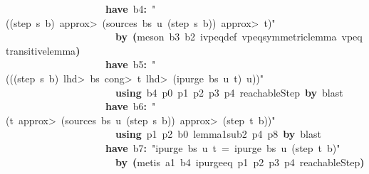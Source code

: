 \documentclass{article}
\newcommand{\syntaxKEYWORDA}[1]{\textcolor[rgb]{0.0,0.4,0.6}{\textbf{#1}}}
\newcommand{\syntaxLITERALA}[1]{\textcolor[rgb]{1.0,0.0,0.8}{#1}}
\newcommand{\syntaxOPERATOR}[1]{\textcolor[rgb]{0.0,0.0,0.0}{\textbf{#1}}}
\newcommand{\syntaxKEYWORDA}[1]{\textcolor[rgb]{0.0,0.4,0.6}{\textbf{#1}}}
\newcommand{\syntaxLITERALA}[1]{\textcolor[rgb]{1.0,0.0,0.8}{#1}}
\newcommand{\syntaxOPERATOR}[1]{\textcolor[rgb]{0.0,0.0,0.0}{\textbf{#1}}}
\newcommand{\syntaxKEYWORDA}[1]{\textcolor[rgb]{0.0,0.4,0.6}{\textbf{#1}}}
\newcommand{\syntaxLITERALA}[1]{\textcolor[rgb]{1.0,0.0,0.8}{#1}}
\newcommand{\syntaxOPERATOR}[1]{\textcolor[rgb]{0.0,0.0,0.0}{\textbf{#1}}}
\newcommand{\syntaxKEYWORDA}[1]{\textcolor[rgb]{0.0,0.4,0.6}{#1}}
\newcommand{\syntaxLITERALA}[1]{\textcolor[rgb]{1.0,0.0,0.8}{\textbf{#1}}}
\newcommand{\syntaxOPERATOR}[1]{\textcolor[rgb]{0.0,0.0,0.0}{#1}}
\newcommand{\syntaxKEYWORDA}[1]{\textcolor[rgb]{0.0,0.4,0.6}{\textbf{#1}}}
\newcommand{\syntaxLITERALA}[1]{\textcolor[rgb]{1.0,0.0,0.8}{#1}}
\newcommand{\syntaxOPERATOR}[1]{\textcolor[rgb]{0.0,0.0,0.0}{\textbf{#1}}}
\newcommand{\syntaxKEYWORDA}[1]{\textcolor[rgb]{0.0,0.4,0.6}{\textbf{#1}}}
\newcommand{\syntaxLITERALA}[1]{\textcolor[rgb]{1.0,0.0,0.8}{#1}}
\newcommand{\syntaxOPERATOR}[1]{\textcolor[rgb]{0.0,0.0,0.0}{\textbf{#1}}}
\begin{document}
{\ }{\ }{\ }{\ }{\ }{\ }{\ }{\ }{\ }{\ }{\ }{\ }{\ }{\ }{\ }{\ }{\ }{\ }{\ }{\ }\syntaxKEYWORDA{have}{\ }b4\syntaxOPERATOR{:}{\ }\syntaxLITERALA{"((step{\ }s{\ }b){\ }\<approx>{\ }(sources{\ }bs{\ }u{\ }(step{\ }s{\ }b)){\ }\<approx>{\ }t)"}\hspace*{\fill}\\
{\ }{\ }{\ }{\ }{\ }{\ }{\ }{\ }{\ }{\ }{\ }{\ }{\ }{\ }{\ }{\ }{\ }{\ }{\ }{\ }{\ }{\ }\syntaxKEYWORDA{by}{\ }\syntaxOPERATOR{(}meson{\ }b3{\ }b2{\ }ivpeq\usebox{\underscorebox}def{\ }vpeq\usebox{\underscorebox}symmetric\usebox{\underscorebox}lemma{\ }vpeq\usebox{\underscorebox}transitive\usebox{\underscorebox}lemma\syntaxOPERATOR{)}\hspace*{\fill}\\
{\ }{\ }{\ }{\ }{\ }{\ }{\ }{\ }{\ }{\ }{\ }{\ }{\ }{\ }{\ }{\ }{\ }{\ }{\ }{\ }\syntaxKEYWORDA{have}{\ }b5\syntaxOPERATOR{:}{\ }\syntaxLITERALA{"(((step{\ }s{\ }b){\ }\<lhd>{\ }bs{\ }\<cong>{\ }t{\ }\<lhd>{\ }(ipurge{\ }bs{\ }u{\ }t){\ }\usebox{\atbox}{\ }u))"}\hspace*{\fill}\\
{\ }{\ }{\ }{\ }{\ }{\ }{\ }{\ }{\ }{\ }{\ }{\ }{\ }{\ }{\ }{\ }{\ }{\ }{\ }{\ }{\ }{\ }\syntaxKEYWORDA{using}{\ }b4{\ }p0{\ }p1{\ }p2{\ }p3{\ }p4{\ }reachableStep{\ }\syntaxKEYWORDA{by}{\ }blast\hspace*{\fill}\\
{\ }{\ }{\ }{\ }{\ }{\ }{\ }{\ }{\ }{\ }{\ }{\ }{\ }{\ }{\ }{\ }{\ }{\ }{\ }{\ }\syntaxKEYWORDA{have}{\ }b6\syntaxOPERATOR{:}{\ }\syntaxLITERALA{"(t{\ }\<approx>{\ }(sources{\ }bs{\ }u{\ }(step{\ }s{\ }b)){\ }\<approx>{\ }(step{\ }t{\ }b))"}\hspace*{\fill}\\
{\ }{\ }{\ }{\ }{\ }{\ }{\ }{\ }{\ }{\ }{\ }{\ }{\ }{\ }{\ }{\ }{\ }{\ }{\ }{\ }{\ }{\ }\syntaxKEYWORDA{using}{\ }p1{\ }p2{\ }b0{\ }lemma\usebox{\underscorebox}1\usebox{\underscorebox}sub\usebox{\underscorebox}2{\ }p4{\ }p8{\ }\syntaxKEYWORDA{by}{\ }blast\hspace*{\fill}\\
{\ }{\ }{\ }{\ }{\ }{\ }{\ }{\ }{\ }{\ }{\ }{\ }{\ }{\ }{\ }{\ }{\ }{\ }{\ }{\ }\syntaxKEYWORDA{have}{\ }b7\syntaxOPERATOR{:}{\ }\syntaxLITERALA{"ipurge{\ }bs{\ }u{\ }t{\ }={\ }ipurge{\ }bs{\ }u{\ }(step{\ }t{\ }b)"}\hspace*{\fill}\\
{\ }{\ }{\ }{\ }{\ }{\ }{\ }{\ }{\ }{\ }{\ }{\ }{\ }{\ }{\ }{\ }{\ }{\ }{\ }{\ }{\ }{\ }\syntaxKEYWORDA{by}{\ }\syntaxOPERATOR{(}metis{\ }a1{\ }b4{\ }ipurge\usebox{\underscorebox}eq{\ }p1{\ }p2{\ }p3{\ }p4{\ }reachableStep\syntaxOPERATOR{)}\hspace*{\fill}\\
\end{document}

